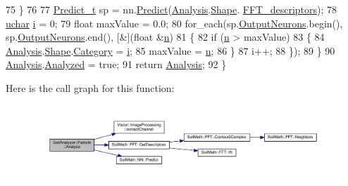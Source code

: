 \begin{DoxyCode}
75             \}
76 
77             \hyperlink{struct_predict__struct}{Predict\_t} sp = nn.\hyperlink{class_soil_math_1_1_n_n_aa7f23fcdb8383a74586c9c30b8bc0af7}{Predict}(\hyperlink{class_soil_analyzer_1_1_particle_a4df8d4d8fb130bce05fef5d4601ef89e}{Analysis}.\hyperlink{class_soil_analyzer_1_1_particle_analysis_results_a75230aa0675b2df489c08bcfffb43b97}{Shape}.
      \hyperlink{class_shape_classification_afecc3c98ca8a930b359ddd936aad21f3}{FFT\_descriptors});
78             \hyperlink{_soil_math_types_8h_a65f85814a8290f9797005d3b28e7e5fc}{uchar} \hyperlink{_comparision_pictures_2_createtest_image_8m_a6f6ccfcf58b31cb6412107d9d5281426}{i} = 0;
79             \textcolor{keywordtype}{float} maxValue = 0.0;
80             for\_each(sp.\hyperlink{struct_predict__struct_aa0708cae93baa061f21452537e86d3bd}{OutputNeurons}.begin(), sp.\hyperlink{struct_predict__struct_aa0708cae93baa061f21452537e86d3bd}{OutputNeurons}.end(), [&](\textcolor{keywordtype}{float} 
      &\hyperlink{_comparision_pictures_2_createtest_image_8m_aeab71244afb687f16d8c4f5ee9d6ef0e}{n})
81             \{
82                 \textcolor{keywordflow}{if} (\hyperlink{_comparision_pictures_2_createtest_image_8m_aeab71244afb687f16d8c4f5ee9d6ef0e}{n} > maxValue)
83                 \{
84                     \hyperlink{class_soil_analyzer_1_1_particle_a4df8d4d8fb130bce05fef5d4601ef89e}{Analysis}.\hyperlink{class_soil_analyzer_1_1_particle_analysis_results_a75230aa0675b2df489c08bcfffb43b97}{Shape}.\hyperlink{class_shape_classification_a5b723e358b86496ed6f4b25e2bf7af17}{Category} = \hyperlink{_comparision_pictures_2_createtest_image_8m_a6f6ccfcf58b31cb6412107d9d5281426}{i};
85                     maxValue = \hyperlink{_comparision_pictures_2_createtest_image_8m_aeab71244afb687f16d8c4f5ee9d6ef0e}{n};
86                 \}
87                 i++;
88             \});
89         \}
90         \hyperlink{class_soil_analyzer_1_1_particle_a4df8d4d8fb130bce05fef5d4601ef89e}{Analysis}.\hyperlink{class_soil_analyzer_1_1_particle_analysis_results_abfb8465c0cfbe9a6ad4d844f6269676f}{Analyzed} = \textcolor{keyword}{true};
91         \textcolor{keywordflow}{return} \hyperlink{class_soil_analyzer_1_1_particle_a4df8d4d8fb130bce05fef5d4601ef89e}{Analysis};
92     \}
\end{DoxyCode}


Here is the call graph for this function\+:\nopagebreak
\begin{figure}[H]
\begin{center}
\leavevmode
\includegraphics[width=350pt]{class_soil_analyzer_1_1_particle_aeb4ed9f49b88f5d6563b993154aabe50_cgraph}
\end{center}
\end{figure}


